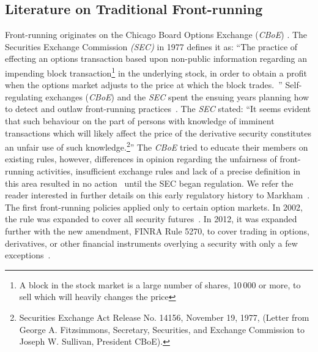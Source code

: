\subsection{Literature on Traditional Front-running}\label{traditionalFrontrunning}
Front-running originates on the Chicago Board Options Exchange (\textit{CBoE}) \cite{markham1988front}. The Securities Exchange Commission \textit{(SEC)} in 1977 defines it as: ``The practice of effecting an options transaction based upon non-public information regarding an impending block transaction\footnote{A block in the stock market is a large number of shares, 10\,000 or more, to sell which will heavily changes the price} in the underlying stock, in order to obtain a profit when the options market adjusts to the price at which the block trades.~\cite{sec1978optionsmarket}'' Self-regulating exchanges (\eg \textit{CBoE}) and the \textit{SEC} spent the ensuing years planning how to detect and outlaw front-running practices~\cite{markham1988front}. The \textit{SEC} stated: ``It seems evident that such behaviour on the part of persons with knowledge of imminent transactions which will likely affect the price of the derivative security constitutes an unfair use of such knowledge.\footnote{Securities Exchange Act Release No. 14156, November 19, 1977, (Letter from George A. Fitzsimmons, Secretary, Securities, and Exchange Commission to Joseph W. Sullivan, President  CBoE).}'' The \textit{CBoE} tried to educate their members on existing rules, however, differences in opinion regarding the unfairness of front-running activities, insufficient exchange rules and lack of a precise definition in this area resulted in no action~\cite{sec1978optionsmarket} until the SEC began regulation. We refer the reader interested in further details on this early regulatory history to Markham~\cite{markham1988front}. The first front-running policies applied only to certain option markets. In 2002, the rule was expanded to cover all security futures~\cite{finra_2002}. In 2012, it was expanded further with the new amendment, FINRA Rule 5270, to cover trading in options, derivatives, or other financial instruments overlying a security with only a few exceptions~\cite{sec2012frontrunning,finra_2012}.



